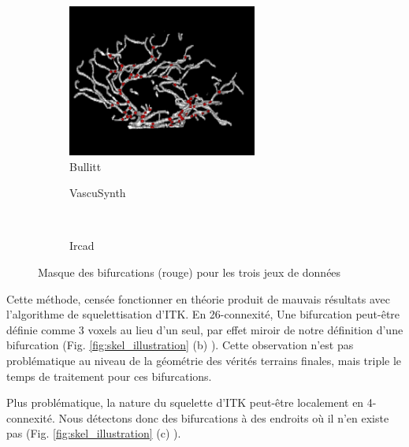 \begin{figure}[!ht]
  \captionsetup[subfigure]{justification=centering}
  \begin{subfigure}{0.45\textwidth}
    \centering
    \includegraphics[height=5cm]{Images/bifurcations_bullitt.png}
    \caption{Bullitt}
  \end{subfigure}
  \begin{subfigure}{0.45\textwidth}
    \centering
    \caption{VascuSynth}
  \end{subfigure}
  \\
  \centering
  \begin{subfigure}{0.45\textwidth}
    \centering
    \caption{Ircad}
  \end{subfigure}
  \caption{Masque des bifurcations (rouge) pour les trois jeux de données}
  \label{fig:bifurcations_masks}
\end{figure}

Cette méthode, censée fonctionner en théorie produit de mauvais résultats avec l'algorithme de squelettisation d'ITK. En 26-connexité, Une bifurcation peut-être définie comme 3 voxels au lieu d'un seul, par effet miroir de notre définition d'une bifurcation (Fig. \ref{fig:skel_illustration} (b) ). Cette observation n'est pas problématique au niveau de la géométrie des vérités terrains finales, mais triple le temps de traitement pour ces bifurcations.

Plus problématique, la nature du squelette d'ITK peut-être localement en 4-connexité. Nous détectons donc des bifurcations à des endroits où il n'en existe pas (Fig. \ref{fig:skel_illustration} (c) ). 

